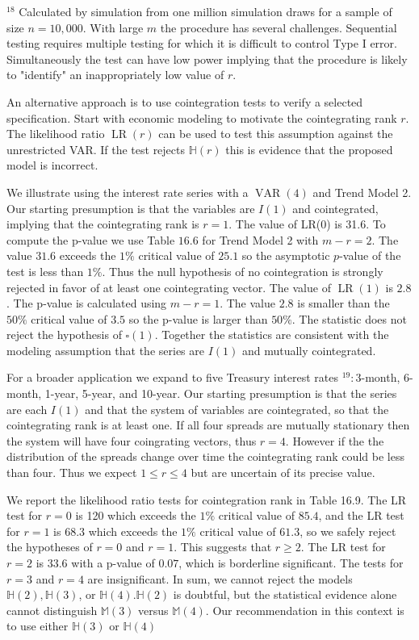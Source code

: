 \documentclass[10pt]{article}
\begin{document}
${ }^{18}$ Calculated by simulation from one million simulation draws for a sample of size $n=10,000$. With large $m$ the procedure has several challenges. Sequential testing requires multiple testing for which it is difficult to control Type I error. Simultaneously the test can have low power implying that the procedure is likely to "identify" an inappropriately low value of $r$.

An alternative approach is to use cointegration tests to verify a selected specification. Start with economic modeling to motivate the cointegrating rank $r$. The likelihood ratio $\operatorname{LR}(r)$ can be used to test this assumption against the unrestricted VAR. If the test rejects $\mathbb{H}(r)$ this is evidence that the proposed model is incorrect.

We illustrate using the interest rate series with a $\operatorname{VAR}(4)$ and Trend Model 2. Our starting presumption is that the variables are $I(1)$ and cointegrated, implying that the cointegrating rank is $r=1$. The value of LR(0) is 31.6. To compute the $\mathrm{p}$-value we use Table $16.6$ for Trend Model 2 with $m-r=2$. The value $31.6$ exceeds the $1 \%$ critical value of $25.1$ so the asymptotic $p$-value of the test is less than $1 \%$. Thus the null hypothesis of no cointegration is strongly rejected in favor of at least one cointegrating vector. The value of $\operatorname{LR}(1)$ is $2.8$. The $\mathrm{p}$-value is calculated using $m-r=1$. The value $2.8$ is smaller than the $50 \%$ critical value of $3.5$ so the p-value is larger than $50 \%$. The statistic does not reject the hypothesis of $\mathbb{\square}(1)$. Together the statistics are consistent with the modeling assumption that the series are $I(1)$ and mutually cointegrated.

For a broader application we expand to five Treasury interest rates ${ }^{19}: 3$-month, 6-month, 1-year, 5-year, and 10-year. Our starting presumption is that the series are each $I(1)$ and that the system of variables are cointegrated, so that the cointegrating rank is at least one. If all four spreads are mutually stationary then the system will have four coingrating vectors, thus $r=4$. However if the the distribution of the spreads change over time the cointegrating rank could be less than four. Thus we expect $1 \leq r \leq 4$ but are uncertain of its precise value.

We report the likelihood ratio tests for cointegration rank in Table 16.9. The LR test for $r=0$ is 120 which exceeds the $1 \%$ critical value of $85.4$, and the LR test for $r=1$ is $68.3$ which exceeds the $1 \%$ critical value of $61.3$, so we safely reject the hypotheses of $r=0$ and $r=1$. This suggests that $r \geq 2$. The LR test for $r=2$ is $33.6$ with a p-value of $0.07$, which is borderline significant. The tests for $r=3$ and $r=4$ are insignificant. In sum, we cannot reject the models $\mathbb{H}(2), \mathbb{H}(3)$, or $\mathbb{H}(4) . \mathbb{H}(2)$ is doubtful, but the statistical evidence alone cannot distinguish $\mathbb{M}(3)$ versus $\mathbb{M}(4)$. Our recommendation in this context is to use either $\mathbb{H}(3)$ or $\mathbb{H}(4)$
\end{document}
